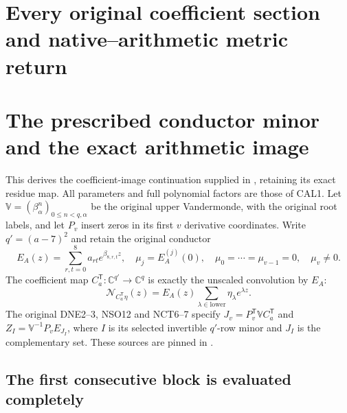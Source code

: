 \documentclass[11pt,a4paper]{article}
\begin{document}
\endgroup

\clearpage
\begingroup


\setcounter{equation}{0}
\renewcommand{\theequation}{A03CM.\arabic{equation}}
\section*{Every original coefficient section and native--arithmetic metric return}
\section{The prescribed conductor minor and the exact arithmetic image}

This derives the coefficient-image continuation supplied in
\cite{a03cm:program:arrival03-01}, retaining its exact residue map.
All parameters and full polynomial factors are those of CAL1.
Let $\mathbb V=(\beta_\alpha^n)_{0\le n<q,\alpha}$ be the
original upper Vandermonde, with the original root labels, and let
$P_v$ insert zeros in its first $v$ derivative coordinates.
Write $q'=(a-7)^2$ and retain the original conductor
\[
 E_A(z)=\sum_{r,t=0}^8a_{rt}e^{\beta_{8,r,t}z},\quad
 \mu_j=E_A^{(j)}(0),\quad
 \mu_0=\cdots=\mu_{v-1}=0,\quad\mu_v\ne0.
 \tag{COI1}
\]
The coefficient map $C_a^{\mathsf T}:\mathbb C^{q'}\to\mathbb C^q$
is exactly the unscaled convolution by $E_A$:
\[
 \mathcal N_{C_a^{\mathsf T}\eta}(z)
       =E_A(z)\sum_{\lambda\in\mathrm{lower}}\eta_\lambda e^{\lambda z}.
 \tag{COI2}
\]
The original DNE2--3, NSO12 and NCT6--7 specify
$J_v=P_v^{\mathsf T}\mathbb VC_a^{\mathsf T}$ and
$Z_I=\mathbb V^{-1}P_vE_{J_I}$, where $I$ is its selected invertible
$q'$-row minor and $J_I$ is the complementary set. These sources are
pinned in \cite{a03cm:program:DNE,a03cm:program:NCT}.

\subsection{The first consecutive block is evaluated completely}
\end{document}

